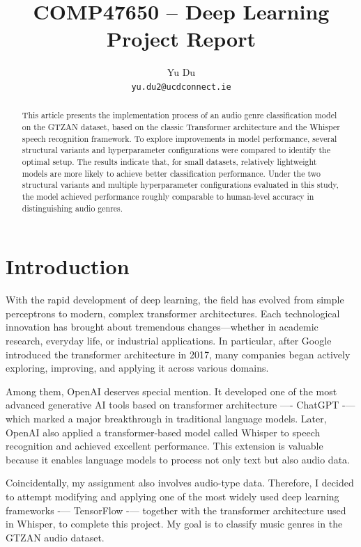 \documentclass{article}
\title{COMP47650 – Deep Learning Project Report}
\author{
  Yu Du \\
  \texttt{yu.du2@ucdconnect.ie} \\
}
\date{}
\begin{document}
  \maketitle

  \begin{abstract}

    This article presents the implementation process of an audio genre classification model on the GTZAN dataset, based on the classic Transformer architecture and the Whisper speech recognition framework. To explore improvements in model performance, several structural variants and hyperparameter configurations were compared to identify the optimal setup. The results indicate that, for small datasets, relatively lightweight models are more likely to achieve better classification performance. Under the two structural variants and multiple hyperparameter configurations evaluated in this study, the model achieved performance roughly comparable to human-level accuracy in distinguishing audio genres.

  \end{abstract}

  \section{Introduction}

    With the rapid development of deep learning, the field has evolved from simple perceptrons to modern, complex transformer architectures. Each technological innovation has brought about tremendous changes—whether in academic research, everyday life, or industrial applications. In particular, after Google introduced the transformer architecture in 2017, many companies began actively exploring, improving, and applying it across various domains.

    Among them, OpenAI deserves special mention. It developed one of the most advanced generative AI tools based on transformer architecture —- ChatGPT -— which marked a major breakthrough in traditional language models. Later, OpenAI also applied a transformer-based model called Whisper to speech recognition and achieved excellent performance. This extension is valuable because it enables language models to process not only text but also audio data.
    
    Coincidentally, my assignment also involves audio-type data. Therefore, I decided to attempt modifying and applying one of the most widely used deep learning frameworks -— TensorFlow -— together with the transformer architecture used in Whisper, to complete this project. My goal is to classify music genres in the GTZAN audio dataset.
    
\end{document}
